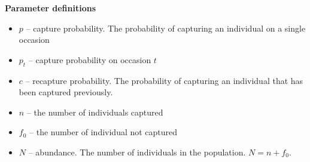 \documentclass[12pt]{article}
\begin{document}
{\bf Parameter definitions}
\begin{itemize}
  \item $p$ -- capture probability. The probability of capturing an
    individual on a single occasion
  \item $p_t$ -- capture probability on occasion $t$
  \item $c$ -- recapture probability. The probability of capturing an
    individual that has been captured previously.
  \item $n$ -- the number of individuals captured
  \item $f_0$ -- the number of individual not captured
  \item $N$ -- abundance. The number of individuals in the
    population. $N=n+f_0$.
\end{itemize}
\end{document}
